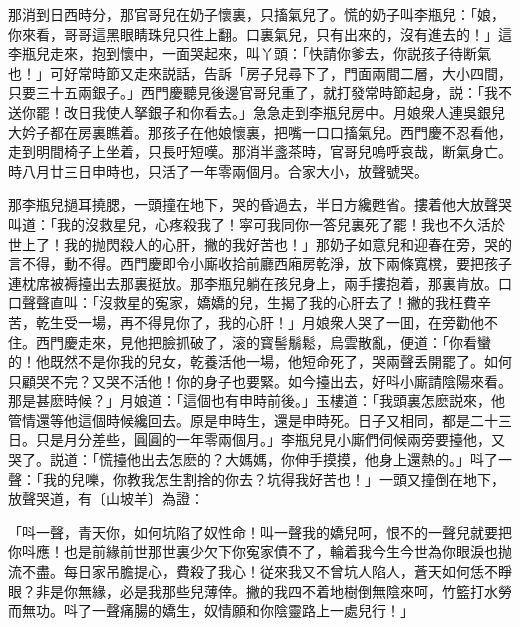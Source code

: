 那消到日西時分，那官哥兒在奶子懷裏，只搐氣兒了。慌的奶子叫李瓶兒：「娘，你來看，哥哥這黑眼睛珠兒只徃上翻。口裏氣兒，只有出來的，沒有進去的！」這李瓶兒走來，抱到懷中，一面哭起來，叫丫頭：「快請你爹去，你説孩子待断氣也！」可好常時節又走來説話，告訴「房子兒尋下了，門面兩間二層，大小四間，只要三十五兩銀子。」西門慶聽見後邊官哥兒重了，就打發常時節起身，説：「我不送你罷！改日我使人拏銀子和你看去。」急急走到李瓶兒房中。月娘衆人連吳銀兒大妗子都在房裏瞧着。那孩子在他娘懷裏，把嘴一口口搐氣兒。西門慶不忍看他，走到明間椅子上坐着，只長吁短嘆。那消半盞茶時，官哥兒嗚呼哀哉，断氣身亡。時八月廿三日申時也，只活了一年零兩個月。合家大小，放聲號哭。

那李瓶兒撾耳撓腮，一頭撞在地下，哭的昏過去，半日方纔甦省。摟着他大放聲哭叫道：「我的沒救星兒，心疼殺我了！寜可我同你一答兒裏死了罷！我也不久活於世上了！我的抛閃殺人的心肝，撇的我好苦也！」那奶子如意兒和迎春在旁，哭的言不得，動不得。西門慶即令小廝收拾前廳西廂房乾淨，放下兩條寬櫈，要把孩子連枕席被褥擡出去那裏挺放。那李瓶兒躺在孩兒身上，兩手摟抱着，那裏肯放。口口聲聲直叫：「沒救星的寃家，嬌嬌的兒，生揭了我的心肝去了！撇的我枉費辛苦，乾生受一場，再不得見你了，我的心肝！」月娘衆人哭了一囬，在旁勸他不住。西門慶走來，見他把臉抓破了，滚的寳髻鬅鬆，烏雲散亂，便道：「你看蠻的！他既然不是你我的兒女，乾養活他一場，他短命死了，哭兩聲丢開罷了。如何只顧哭不完？又哭不活他！你的身子也要緊。如今擡出去，好呌小廝請陰陽來看。那是甚麽時候？」月娘道：「這個也有申時前後。」玉樓道：「我頭裏怎麽説來，他管情還等他這個時候纔回去。原是申時生，還是申時死。日子又相同，都是二十三日。只是月分差些，圓圓的一年零兩個月。」李瓶兒見小廝們伺候兩旁要擡他，又哭了。説道：「慌擡他出去怎麽的？大媽媽，你伸手摸摸，他身上還熱的。」呌了一聲：「我的兒嚛，你教我怎生割捨的你去？坑得我好苦也！」一頭又撞倒在地下，放聲哭道，有〔山坡羊〕為證：

\begin{myquote}
「呌一聲，青天你，如何坑陷了奴性命！叫一聲我的嬌兒呵，恨不的一聲兒就要把你呌應！也是前緣前世那世裏少欠下你寃家債不了，輪着我今生今世為你眼淚也抛流不盡。每日家吊膽提心，費殺了我心！従來我又不曾坑人陷人，蒼天如何恁不睜眼？非是你無緣，必是我那些兒薄倖。撇的我四不着地樹倒無陰來呵，竹籃打水勞而無功。呌了一聲痛腸的嬌生，奴情願和你陰靈路上一處兒行！」
\end{myquote}

